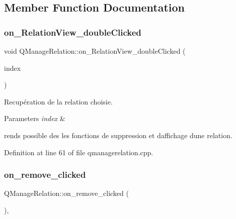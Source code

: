 \subsection{Member Function Documentation}
\mbox{\label{class_q_manage_relation_a45a9416aa18e0d6729ef5d0f9c37e626}} 
\subsubsection{\texorpdfstring{on\+\_\+\+Relation\+View\+\_\+double\+Clicked}{on\_RelationView\_doubleClicked}}
{\footnotesize\ttfamily void Q\+Manage\+Relation\+::on\+\_\+\+Relation\+View\+\_\+double\+Clicked (\begin{DoxyParamCaption}\item[{Q\+Model\+Index}]{index }\end{DoxyParamCaption})\hspace{0.3cm}{\ttfamily [slot]}}



Recupération de la relation choisie. 


\begin{DoxyParams}{Parameters}
{\em index} & \\
\hline
\end{DoxyParams}
rends possible des les fonctions de suppression et d\textquotesingle{}affichage d\textquotesingle{}une relation. 

Definition at line 61 of file qmanagerelation.\+cpp.

\mbox{\label{class_q_manage_relation_a0ad8c5f51b68248b2d42e980d99e4820}} 
\subsubsection{\texorpdfstring{on\+\_\+remove\+\_\+clicked}{on\_remove\_clicked}}
{\footnotesize\ttfamily Q\+Manage\+Relation\+::on\+\_\+remove\+\_\+clicked (\begin{DoxyParamCaption}{ }\end{DoxyParamCaption})\hspace{0.3cm}{\ttfamily [inline]}, {\ttfamily [slot]}}



